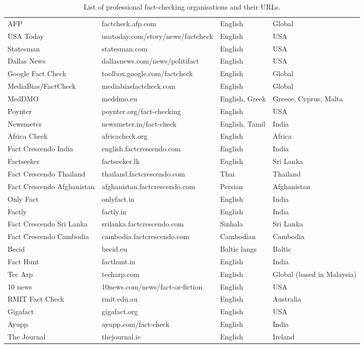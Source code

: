 \begin{table*}
{\begin{tabular}{llll}
        AFP & factcheck.afp.com & English & Global \\
        USA Today & usatoday.com/story/news/factcheck & English & USA \\
        Statesman & statesman.com & English & USA \\
        Dallas News & dallasnews.com/news/politifact & English & USA \\
        Google Fact Check & toolbox.google.com/factcheck & English & Global \\
        MediaBias/FactCheck & mediabiasfactcheck.com & English & Global \\
        MedDMO & meddmo.eu & English, Greek & Greece, Cyprus, Malta \\
        Poynter & poynter.org/fact-checking & English & USA \\
        Newsmeter & newsmeter.in/fact-check & English, Tamil & India \\
        Africa Check & africacheck.org & English & Africa \\
        Fact Crescendo India & english.factcrescendo.com & English & India \\
        Factseeker & factseeker.lk & English & Sri Lanka \\
        Fact Crescendo Thailand & thailand.factcrescendo.com & Thai & Thailand \\
        Fact Crescendo Afghanistan & afghanistan.factcrescendo.com & Persian & Afghanistan \\
        Only Fact & onlyfact.in & English & India \\
        Factly & factly.in & English & India \\
        Fact Crescendo Sri Lanka & srilanka.factcrescendo.com & Sinhala & Sri Lanka \\
        Fact Crescendo Cambodia & cambodia.factcrescendo.com & Cambodian & Cambodia \\
        Becid & becid.eu & Baltic langs & Baltic \\
        Fact Hunt & facthunt.in & English & India \\
        Tec Arp & techarp.com & English & Global (based in Malaysia) \\
        10 news & 10news.com/news/fact-or-fiction & English & USA \\
        RMIT Fact Check & rmit.edu.au & English & Australia \\
        Gigafact & gigafact.org & English & USA \\
        Ayupp & ayupp.com/fact-check & English & India \\
        The Journal & thejournal.ie & English & Ireland \\
    \bottomrule
    \end{tabular}
}
\caption{List of professional fact-checking organisations and their URLs.}
\label{tab:fact_check_orgs}
\end{table*}

